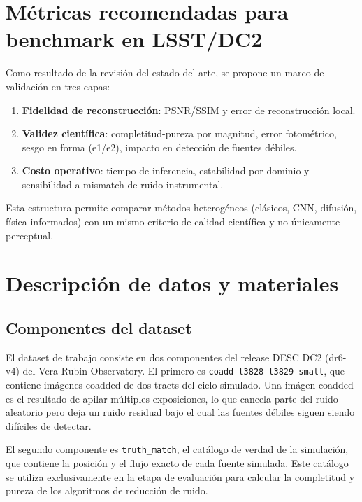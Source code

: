 \section{M\'etricas recomendadas para benchmark en LSST/DC2}

Como resultado de la revisi\'on del estado del arte, se propone un marco de validaci\'on en tres capas:

\begin{enumerate}[leftmargin=*]
    \item \textbf{Fidelidad de reconstrucci\'on}: PSNR/SSIM y error de reconstrucci\'on local.
    \item \textbf{Validez cient\'ifica}: completitud-pureza por magnitud, error fotom\'etrico, sesgo en forma (e1/e2), impacto en detecci\'on de fuentes d\'ebiles.
    \item \textbf{Costo operativo}: tiempo de inferencia, estabilidad por dominio y sensibilidad a mismatch de ruido instrumental.
\end{enumerate}

Esta estructura permite comparar m\'etodos heterog\'eneos (cl\'asicos, CNN, difusi\'on, f\'isica-informados) con un mismo criterio de calidad cient\'ifica y no \'unicamente perceptual.

\section{Descripci\'on de datos y materiales}

\subsection{Componentes del dataset}

El dataset de trabajo consiste en dos componentes del release DESC DC2 (dr6-v4) del Vera Rubin Observatory. El primero es \texttt{coadd-t3828-t3829-small}, que contiene im\'agenes coadded de dos tracts del cielo simulado. Una im\'agen coadded es el resultado de apilar m\'ultiples exposiciones, lo que cancela parte del ruido aleatorio pero deja un ruido residual bajo el cual las fuentes d\'ebiles siguen siendo dif\'iciles de detectar.

\bigskip

El segundo componente es \texttt{truth\_match}, el cat\'alogo de verdad de la simulaci\'on, que contiene la posici\'on y el flujo exacto de cada fuente simulada. Este cat\'alogo se utiliza exclusivamente en la etapa de evaluaci\'on para calcular la completitud y pureza de los algoritmos de reducci\'on de ruido.

